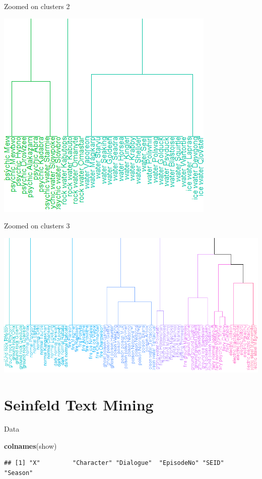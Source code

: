 \documentclass[
  ignorenonframetext,
]{beamer}
\newenvironment{Shaded}{\begin{snugshade}}{\end{snugshade}}
\newcommand{\KeywordTok}[1]{\textcolor[rgb]{0.13,0.29,0.53}{\textbf{#1}}}
\newcommand{\NormalTok}[1]{#1}
\begin{document}
\begin{frame}{Zoomed on clusters 2}
\protect\hypertarget{zoomed-on-clusters-2}{}

\includegraphics{pokemon_dend_02.PNG}

\end{frame}

\begin{frame}{Zoomed on clusters 3}
\protect\hypertarget{zoomed-on-clusters-3}{}

\includegraphics{pokemon_dend_03.PNG}

\end{frame}

\hypertarget{seinfeld-text-mining}{%
\section{Seinfeld Text Mining}\label{seinfeld-text-mining}}

\begin{frame}[fragile]{Data}
\protect\hypertarget{data-1}{}

\begin{Shaded}
\begin{Highlighting}[]
\KeywordTok{colnames}\NormalTok{(show)}
\end{Highlighting}
\end{Shaded}

\begin{verbatim}
## [1] "X"         "Character" "Dialogue"  "EpisodeNo" "SEID"      "Season"
\end{verbatim}

\end{frame}
\end{document}
